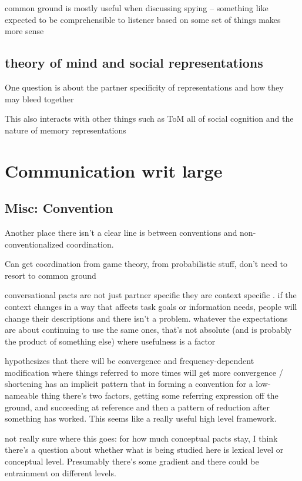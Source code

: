 \documentclass[]{article}
\begin{document}
common ground is mostly useful when discussing spying -- something like expected to be comprehensible to listener based on some set of things makes more sense 

\subsection{theory of mind and social representations}
One question is about the partner specificity of representations and how they may bleed together

This also interacts with other things such as ToM all of social cognition and the nature of memory representations 


\section{Communication writ large}
\subsection{Misc: Convention}

Another place there isn't a clear line is between conventions and non-conventionalized coordination. 

Can get coordination from game theory, from probabilistic stuff, don't need to resort to common ground

conversational pacts are not just partner specific they are context specific \cite{ibarra2016}. if the context changes in a way that affects task goals or information needs, people will change their descriptions and there isn't a problem. whatever the expectations are about continuing to use the same ones, that's not absolute (and is probably the product of something else) where usefulness is a factor 

\cite{krauss1964} hypothesizes that there will be convergence and frequency-dependent modification where things referred to more times will get more convergence / shortening
 \cite{leung2023} has an implicit pattern that in forming a convention for a low-nameable thing there's two factors, getting some referring expression off the ground, and succeeding at reference and then a pattern of reduction after something has worked. This seems like a really useful high level framework. 
 
 not really sure where this goes: \cite{metzing2003a} for how much conceptual pacts stay, I think there's a question about whether what is being studied here is lexical level or conceptual level. Presumably there's some gradient and there could be entrainment on different levels. 
 
\end{document}
